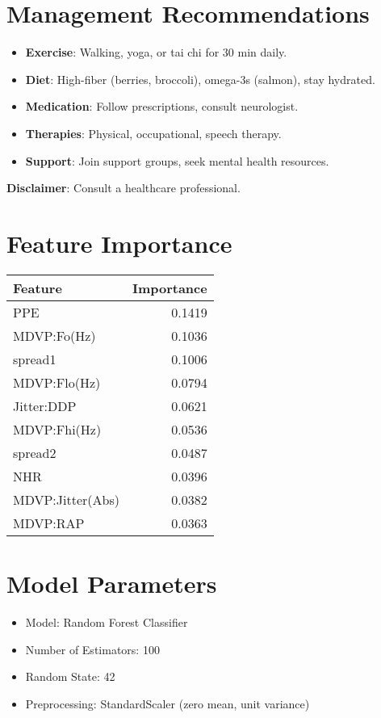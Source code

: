 \documentclass[a4paper,10pt]{article}
\begin{document}
\section*{Management Recommendations}
\begin{itemize}
    \item \textbf{Exercise}: Walking, yoga, or tai chi for 30 min daily.
    \item \textbf{Diet}: High-fiber (berries, broccoli), omega-3s (salmon), stay hydrated.
    \item \textbf{Medication}: Follow prescriptions, consult neurologist.
    \item \textbf{Therapies}: Physical, occupational, speech therapy.
    \item \textbf{Support}: Join support groups, seek mental health resources.
\end{itemize}
\textbf{Disclaimer}: Consult a healthcare professional.

\section*{Feature Importance}
\begin{tabular}{lr}
\toprule
Feature & Importance \\
\midrule
PPE & 0.1419 \\ 
MDVP:Fo(Hz) & 0.1036 \\ 
spread1 & 0.1006 \\ 
MDVP:Flo(Hz) & 0.0794 \\ 
Jitter:DDP & 0.0621 \\ 
MDVP:Fhi(Hz) & 0.0536 \\ 
spread2 & 0.0487 \\ 
NHR & 0.0396 \\ 
MDVP:Jitter(Abs) & 0.0382 \\ 
MDVP:RAP & 0.0363 \\ 

\bottomrule
\end{tabular}

\section*{Model Parameters}
\begin{itemize}
    \item Model: Random Forest Classifier
    \item Number of Estimators: 100
    \item Random State: 42
    \item Preprocessing: StandardScaler (zero mean, unit variance)
\end{itemize}
\end{document}
